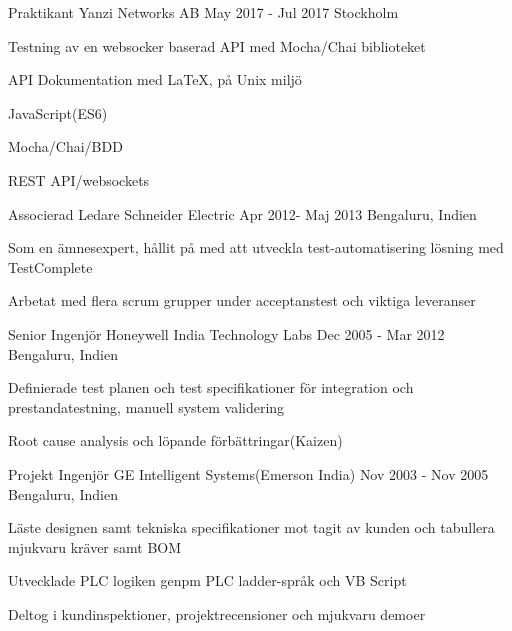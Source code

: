 \documentclass[12pt, a4paper]{awesome-cv}
\begin{document}
\begin{cventries}
    \cventry
      {Praktikant}
      {Yanzi Networks AB}
      {May 2017 - Jul 2017}
      {Stockholm}
      {
        \begin{cvitems}
          \item Testning av en websocker baserad API med Mocha/Chai biblioteket
          \item API Dokumentation med LaTeX, på Unix miljö
          \item JavaScript(ES6)
          \item Mocha/Chai/BDD
          \item REST API/websockets
          \end{cvitems}
      }


    \cventry
      {Associerad Ledare}
      {Schneider Electric}
      {Apr 2012- Maj 2013}
      {Bengaluru, Indien}
      {
        \begin{cvitems}
          \item Som en ämnesexpert, hållit på med att utveckla test-automatisering lösning med TestComplete
          \item Arbetat med flera scrum grupper under acceptanstest och viktiga leveranser
          \end{cvitems}
      }

    \cventry
      {Senior Ingenjör}
      {Honeywell India Technology Labs}
      {Dec 2005 - Mar 2012}
      {Bengaluru, Indien}
      {
        \begin{cvitems}
        \item Definierade test planen och test specifikationer för integration och prestandatestning, manuell system validering
        \item Root cause analysis och löpande förbättringar(Kaizen)
        \end{cvitems}
      }

    \cventry
      {Projekt Ingenjör}
      {GE Intelligent Systems(Emerson India)}
      {Nov 2003 - Nov 2005}
      {Bengaluru, Indien}
      {
        \begin{cvitems}
        \item Läste designen samt tekniska specifikationer mot tagit av kunden och tabullera mjukvaru kräver samt BOM
        \item Utvecklade PLC logiken genpm PLC ladder-språk och VB Script
        \item Deltog i kundinspektioner, projektrecensioner och mjukvaru demoer
        \end{cvitems}
      }
  \end{cventries}
\end{document}
